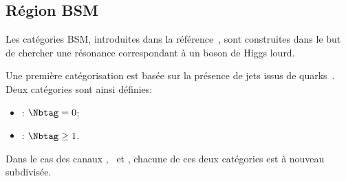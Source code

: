 \subsection{Région \og BSM \fg{}}\label{chapter-HTT_analysis-section-categorisation-BSM}
Les catégories BSM, introduites dans la référence~\cite{CMS-PAS-HIG-17-020}, sont construites dans le but de chercher une résonance correspondant à un boson de Higgs lourd.
\par
Une première catégorisation est basée sur la présence de jets issus de quarks~\quarkb.
Deux catégories sont ainsi définies:
\begin{itemize}
\item \CATnobtag: $\Nbtag =0$;
\item \CATbtag: $\Nbtag\geq1$.
\end{itemize}
Dans le cas des canaux \mu\tauh, \ele\tauh\ et \ele\mu, chacune de ces deux catégories est à nouveau subdivisée.
